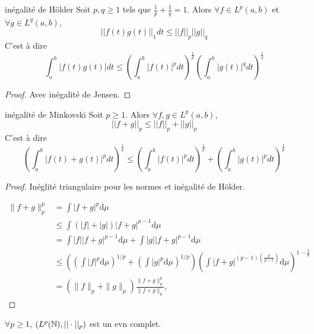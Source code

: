 \begin{proposition}{inégalité de Hölder}{}
    Soit $p, q \geqslant 1$ tels que $\frac{1}{p} + \frac{1}{q} = 1$. Alors $\forall f \in L^p(a,b)$ et $\forall g \in L^q(a,b)$, 
    \[
        ||f(t) g(t)||_1 dt \leqslant ||f||_p ||g||_q
    \]
    C'est à dire 
    \[
        \int_a^b |f(t) g(t)| dt \leqslant \left( \int_a^b |f(t)|^p dt \right)^{\frac{1}{p}} \left( \int_a^b |g(t)|^q dt \right)^{\frac{1}{q}}
    \]
\end{proposition}

\begin{proof}
    Avec inégalité de Jensen. 
\end{proof}


\begin{proposition}{inégalité de Minkovski}{}
    Soit $p \geqslant 1$. Alors $\forall f, g \in L^p(a,b)$, 
    \[
        ||f + g||_p \leqslant ||f||_p + ||g||_p
    \]
    C'est à dire 
    \[
        \left( \int_a^b |f(t) + g(t)|^p dt \right)^{\frac{1}{p}} \leqslant \left( \int_a^b |f(t)|^p dt \right)^{\frac{1}{p}} + \left( \int_a^b |g(t)|^p dt \right)^{\frac{1}{p}}
    \]

\end{proposition}

\begin{proof}
    Inéglité triangulaire pour les normes et inégalité de Hölder.

    $${\displaystyle {
    \begin{aligned}\|f+g\|_{p}^{p}&=\int |f+g|^{p}\mathrm {d} \mu \\&\leq \int (|f|+|g|)|f+g|^{p-1}\mathrm {d} \mu \\&=\int |f||f+g|^{p-1}\mathrm {d} \mu +\int |g||f+g|^{p-1}\mathrm {d} \mu \\&\leq \left(\left(\int |f|^{p}\mathrm {d} \mu \right)^{1/p}+\left(\int |g|^{p}\mathrm {d} \mu \right)^{1/p}\right)\left(\int |f+g|^{(p-1)\left({\frac {p}{p-1}}\right)}\mathrm {d} \mu \right)^{1-{\frac {1}{p}}}\\&=(\|f\|_{p}+\|g\|_{p}){\frac {\|f+g\|_{p}^{p}}{\|f+g\|_{p}}},
    \end{aligned}}}$$
\end{proof}

\begin{proposition}{}{}
    $\forall p \geqslant 1$, $(L^p(\mathbb{N}), ||\cdot||_p)$ est un evn complet.
\end{proposition}

